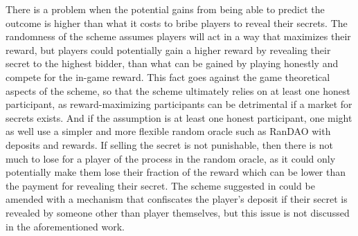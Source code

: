 There is a problem when the potential gains from being able to predict the outcome is higher than what it costs to bribe players to reveal their secrets. The randomness of the scheme assumes players will act in a way that maximizes their reward, but players could potentially gain a higher reward by revealing their secret to the highest bidder, than what can be gained by playing honestly and compete for the in-game reward. This fact goes against the game theoretical aspects of the scheme, so that the scheme ultimately relies on at least one honest participant, as reward-maximizing participants can be detrimental if a market for secrets exists. And if the assumption is at least one honest participant, one might as well use a simpler and more flexible random oracle such as RanDAO with deposits and rewards. If selling the secret is not punishable, then there is not much to lose for a player of the process in the random oracle, as it could only potentially make them lose their fraction of the reward which can be lower than the payment for revealing their secret. The scheme suggested in \cite{chatterjee_probabilistic_2019} could be amended with a mechanism that confiscates the player's deposit if their secret is revealed by someone other than player themselves, but this issue is not discussed in the aforementioned work.
